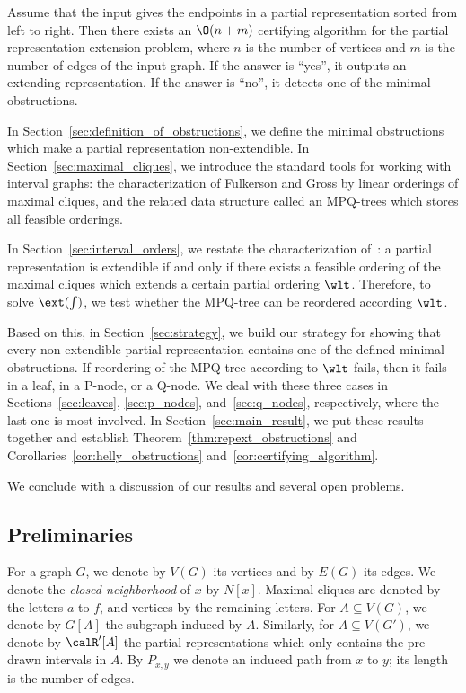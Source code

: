 \begin{corollary} \label{cor:certifying_algorithm}
Assume that the input gives the endpoints in a partial representation sorted from left to right.
Then there exists an $\O(n+m)$ certifying algorithm for the partial representation extension problem,
where $n$ is the number of vertices and $m$ is the number of edges of the input graph. If the answer
is ``yes'', it outputs an extending representation. If the answer is ``no'', it detects one of the
minimal obstructions.
\end{corollary}

 In Section~\ref{sec:definition_of_obstructions}, we define the minimal
obstructions which make a partial representation non-extendible. In
Section~\ref{sec:maximal_cliques}, we introduce the standard tools for working with interval graphs:
the characterization of Fulkerson and Gross by linear orderings of maximal cliques, and the related
data structure called an MPQ-trees which stores all feasible orderings.

In Section~\ref{sec:interval_orders}, we restate the characterization of~\cite{kkosv}: a partial
representation is extendible if and only if there exists a feasible ordering of the maximal cliques
which extends a certain partial ordering $\wlt$. Therefore, to solve $\ext(\int)$, we test whether
the MPQ-tree can be reordered according $\wlt$.

Based on this, in Section~\ref{sec:strategy}, we build our strategy for showing that every
non-extendible partial representation contains one of the defined minimal obstructions. If
reordering of the MPQ-tree according to $\wlt$ fails, then it fails in a leaf, in a P-node, or a
Q-node. We deal with these three cases in Sections~\ref{sec:leaves}, \ref{sec:p_nodes},
and~\ref{sec:q_nodes}, respectively, where the last one is most involved. In
Section~\ref{sec:main_result}, we put these results together and establish
Theorem~\ref{thm:repext_obstructions} and Corollaries~\ref{cor:helly_obstructions}
and~\ref{cor:certifying_algorithm}.

We conclude with a discussion of our results and several open problems.

\subsection{Preliminaries}

For a graph $G$, we denote by $V(G)$ its vertices and by $E(G)$ its edges. We denote the
\emph{closed neighborhood} of $x$ by $N[x]$. Maximal cliques are denoted by the letters $a$ to $f$,
and vertices by the remaining letters. For $A \subseteq V(G)$, we denote by $G[A]$ the subgraph
induced by $A$. Similarly, for $A \subseteq V(G')$, we denote by $\calR'[A]$ the partial
representations which only contains the pre-drawn intervals in $A$. By $P_{x,y}$ we denote an
induced path from $x$ to $y$; its length is the number of edges.

